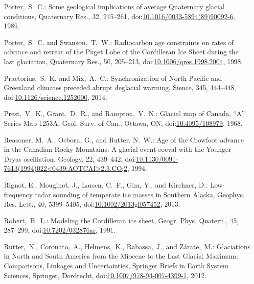 \documentclass[tc, manuscript]{copernicus}
\begin{document}
\begin{thebibliography}{114}
Porter,~S.~C.: Some geological implications of average Quaternary glacial conditions, Quaternary Res., 32, 245--261,
doi:\href{http://dx.doi.org/10.1016/0033-5894(89)90092-6}{10.1016/0033-5894(89)90092-6}, 1989.


Porter,~S.~C. and Swanson,~T.~W.: Radiocarbon age constraints on rates of advance and retreat of the {P}uget {L}obe of the {C}ordilleran {I}ce {S}heet during the last glaciation, Quaternary Res., 50, 205--213,
doi:\href{http://dx.doi.org/10.1006/qres.1998.2004}{10.1006/qres.1998.2004}, 1998.


Praetorius,~S.~K. and Mix,~A.~C.: Synchronization of North Pacific and Greenland climates preceded abrupt deglacial warming, Sience, 345, 444--448,
doi:\href{http://dx.doi.org/10.1126/science.1252000}{10.1126/science.1252000}, 2014.


Prest,~V.~K., Grant,~D.~R., and Rampton,~V.~N.: Glacial map of Canada, ``A'' Series Map 1253A, Geol. Surv. of Can., Ottawa, ON,
doi:\href{http://dx.doi.org/10.4095/108979}{10.4095/108979}, 1968.


Reasoner, M.~A., Osborn, G., and Rutter, N.~W.: Age of the Crowfoot advance in the Canadian Rocky Mountains: A glacial event coeval with the Younger Dryas oscillation, Geology, 22, 439--442,
doi:\href{http://dx.doi.org/10.1130/0091-7613(1994)022<0439:AOTCAI>2.3.CO;2}{10.1130/0091-7613(1994)022<0439:AOTCAI>2.3.CO;2}, 1994.


Rignot, E., Mouginot, J., Larsen, C.~F., Gim, Y., and Kirchner, D.: Low-frequency radar sounding of temperate ice masses in Southern Alaska, Geophys. Res. Lett., 40, 5399--5405,
doi:\href{http://dx.doi.org/10.1002/2013gl057452}{10.1002/2013gl057452}, 2013.


Robert,~B.~L.: Modeling the Cordilleran ice sheet, G{e}ogr. Phys. Quatern., 45, 287--299,
doi:\href{http://dx.doi.org/10.7202/032876ar}{10.7202/032876ar}, 1991.


Rutter,~N., Coronato,~A., Helmens,~K., Rabassa,~J., and Z{\'a}rate,~M.: Glaciations in North and South America from the Miocene to the Last Glacial Maximum: Comparisons, Linkages and Uncertainties, Springer Briefs in Earth System Sciences, Springer, Dordrecht,
doi:\href{http://dx.doi.org/10.1007/978-94-007-4399-1}{10.1007/978-94-007-4399-1}, 2012.



\end{thebibliography}
\end{document}
